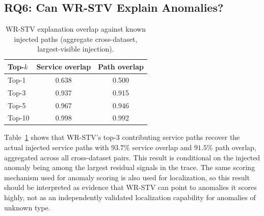 \documentclass[informatics,article,submit,moreauthors]{Definitions/mdpi}
\begin{document}
\subsection{RQ6: Can WR-STV Explain Anomalies?}
\label{sec:results-explainability}
\begin{table}[t]
	\centering
	\caption{WR-STV explanation overlap against known injected paths
		(aggregate cross-dataset, largest-visible injection).}
	\label{tab:explainability}
	\begin{tabular}{lcc}
		\toprule
		\textbf{Top-$k$} & \textbf{Service overlap} & \textbf{Path overlap} \\
		\midrule
		Top-1  & 0.638 & 0.500 \\
		Top-3  & 0.937 & 0.915 \\
		Top-5  & 0.967 & 0.946 \\
		Top-10 & 0.998 & 0.992 \\
		\bottomrule
	\end{tabular}
\end{table}

Table~\ref{tab:explainability} shows that WR-STV's top-3 contributing
service paths recover the actual injected service paths with
\(93.7\%\) service overlap and \(91.5\%\) path overlap, aggregated across
all cross-dataset pairs. This result is conditional on the injected
anomaly being among the largest residual signals in the trace. The same
scoring mechanism used for anomaly scoring is also used for localization,
so this result should be interpreted as evidence that WR-STV can point to
anomalies it scores highly, not as an independently validated
localization capability for anomalies of unknown type.
\end{document}
